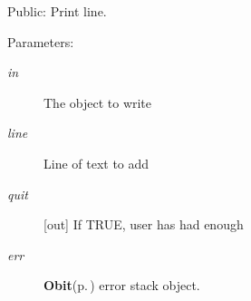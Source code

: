 Public: Print line. 

\begin{Desc}
\item[Parameters:]
\begin{description}
\item[{\em in}]The object to write \item[{\em line}]Line of text to add \item[{\em quit}][out] If TRUE, user has had enough \item[{\em err}]{\bf Obit}{\rm (p.\,\pageref{structObit})} error stack object. \end{description}
\end{Desc}
